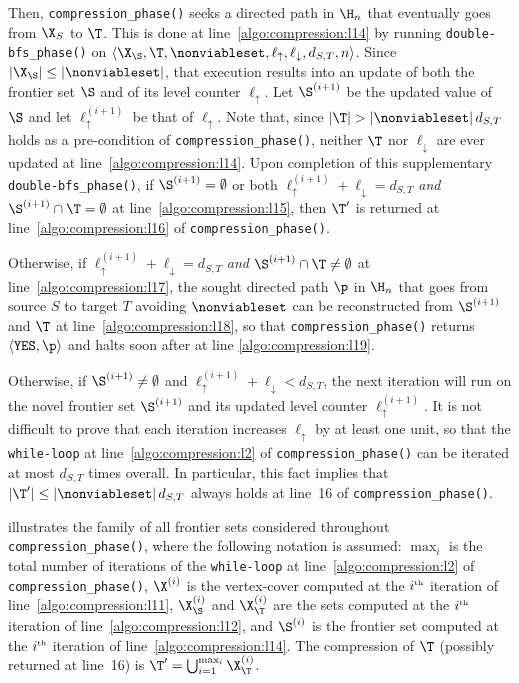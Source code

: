 \begin{enumerate}
Then, \texttt{compression\_phase()}
seeks a directed
path in $\H_n$ that eventually goes from $\X_S$ to $\T$.
This is done at line~\ref{algo:compression:l14} by running
\texttt{double-bfs\_phase()}
on $\langle \X_\S, \T, \nonviableset, \ell_\uparrow, \ell_\downarrow, d_{S,T}, n \rangle$.
Since $|\X_\S|\leq |\nonviableset|$, that execution results into an update of
both the frontier set $\S$ and of its level counter $\ell_\uparrow$.
Let $\S^{(i+1)}$ be the updated value of $\S$ and let $\ell^{(i+1)}_\uparrow$ be that of $\ell_\uparrow$.
Note that, since $|\T| > |\nonviableset|\, d_{S,T}$ holds as a pre-condition of \texttt{compression\_phase()},
neither $\T$ nor $\ell_\downarrow$ are ever updated at line~\ref{algo:compression:l14}.
Upon completion of this supplementary \texttt{double-bfs\_phase()},
if $\S^{(i+1)}=\emptyset$ or both
$\ell^{(i+1)}_\uparrow+\ell_\downarrow = d_{S,T}$ \emph{and}
$\S^{(i+1)}\cap\T=\emptyset$ at line~\ref{algo:compression:l15},
then $\T'$
is returned at line~\ref{algo:compression:l16} of \texttt{compression\_phase()}.

Otherwise, if $\ell^{(i+1)}_\uparrow + \ell_\downarrow = d_{S,T}$ \emph{and} $\S^{(i+1)}\cap\T\neq\emptyset$ at line~\ref{algo:compression:l17},
the sought directed path $\p$ in $\H_n$ that goes from source $S$ to target $T$ avoiding $\nonviableset$
can be reconstructed from $\S^{(i+1)}$ and $\T$ at line~\ref{algo:compression:l18},
so that \texttt{compression\_phase()} returns $\langle \texttt{YES}, \p \rangle$
and halts soon after at line \ref{algo:compression:l19}.

Otherwise, if $\S^{(i+1)}\neq\emptyset$ and $\ell^{(i+1)}_\uparrow + \ell_\downarrow < d_{S,T}$,
the next iteration will run on the novel frontier set $\S^{(i+1)}$ and its updated level counter $\ell^{(i+1)}_\uparrow$.
It is not difficult to prove that each iteration increases $\ell_\uparrow$ by at least one unit,
so that the \texttt{while-loop} at line~\ref{algo:compression:l2} of \texttt{compression\_phase()}
can be iterated at most $d_{S,T}$ times overall.
In particular, this fact implies that $|\T'|\leq |\nonviableset|\, d_{S,T}$
always holds at line~16 of \texttt{compression\_phase()}.
\end{enumerate}

 illustrates the family of all frontier sets considered throughout \texttt{com\-pres\-sion\_phase()},
where the following notation is assumed:
$\max_i$ is the total number of iterations of the \texttt{while-loop}
at line~\ref{algo:compression:l2} of \texttt{compression\_phase()},
$\X^{(i)}$ is the vertex-cover computed at the $i^{\mbox{\tiny th}}$ iteration of line~\ref{algo:compression:l11},
$\X_\S^{(i)}$ and $\X_\T^{(i)}$ are the sets computed at the $i^{\mbox{\tiny th}}$ iteration of line~\ref{algo:compression:l12}, and
$\S^{(i)}$ is the frontier set computed at the $i^{\mbox{\tiny th}}$ iteration of line~\ref{algo:compression:l14}.
The compression of $\T$ (possibly returned at line~16)
is
$\T'=\bigcup_{i=1}^{\max_i} \X^{(i)}_\T$.



